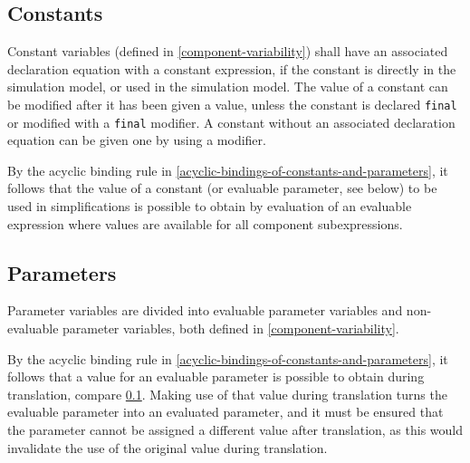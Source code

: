 \subsection{Constants}\label{constants}

Constant variables (defined in \cref{component-variability}) shall have an associated declaration equation with a constant expression, if the constant is directly in the simulation model, or used in the simulation model.
The value of a constant can be modified after it has been given a value, unless the constant is declared \lstinline!final! or modified with a \lstinline!final! modifier.
A constant without an associated declaration equation can be given one by using a modifier.

By the acyclic binding rule in \cref{acyclic-bindings-of-constants-and-parameters}, it follows that the value of a constant (or evaluable parameter, see below) to be used in simplifications is possible to obtain by evaluation of an evaluable expression where values are available for all component subexpressions.


\subsection{Parameters}\label{parameters}

Parameter variables are divided into evaluable parameter variables and non-evaluable parameter variables, both defined in \cref{component-variability}.

By the acyclic binding rule in \cref{acyclic-bindings-of-constants-and-parameters}, it follows that a value for an evaluable parameter is possible to obtain during translation, compare \cref{constants}.
Making use of that value during translation turns the evaluable parameter into an evaluated parameter, and it must be ensured that the parameter cannot be assigned a different value after translation, as this would invalidate the use of the original value during translation.

